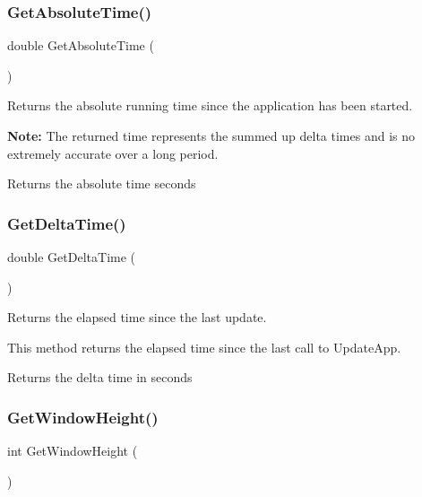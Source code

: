 \subsubsection{\texorpdfstring{Get\+Absolute\+Time()}{GetAbsoluteTime()}}
{\footnotesize\ttfamily double Get\+Absolute\+Time (\begin{DoxyParamCaption}{ }\end{DoxyParamCaption})}

Returns the absolute running time since the application has been started.

{\bfseries Note\+:} The returned time represents the summed up delta times and is no extremely accurate over a long period.

\begin{DoxyReturn}{Returns}
the absolute time seconds 
\end{DoxyReturn}
\mbox{\label{group__sdl__group_gaf9e3349b29171ad58521f5a7a6238fca}} 
\subsubsection{\texorpdfstring{Get\+Delta\+Time()}{GetDeltaTime()}}
{\footnotesize\ttfamily double Get\+Delta\+Time (\begin{DoxyParamCaption}{ }\end{DoxyParamCaption})}

Returns the elapsed time since the last update.

This method returns the elapsed time since the last call to Update\+App.

\begin{DoxyReturn}{Returns}
the delta time in seconds 
\end{DoxyReturn}
\mbox{\label{group__sdl__group_gac27ddd893a70056c55278b33d7bd2c62}} 
\subsubsection{\texorpdfstring{Get\+Window\+Height()}{GetWindowHeight()}}
{\footnotesize\ttfamily int Get\+Window\+Height (\begin{DoxyParamCaption}{ }\end{DoxyParamCaption})}


